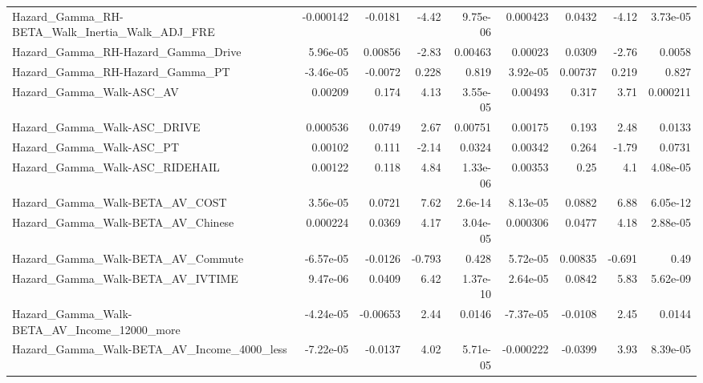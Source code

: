 \begin{tabular}{lrrrrrrrr}
Hazard\_Gamma\_RH-BETA\_Walk\_Inertia\_Walk\_ADJ\_FRE     &   -0.000142 &      -0.0181 &    -4.42 & 9.75e-06 &   0.000423 &      0.0432 &        -4.12 &      3.73e-05 \\
Hazard\_Gamma\_RH-Hazard\_Gamma\_Drive                 &    5.96e-05 &      0.00856 &    -2.83 &  0.00463 &    0.00023 &      0.0309 &        -2.76 &        0.0058 \\
Hazard\_Gamma\_RH-Hazard\_Gamma\_PT                    &   -3.46e-05 &      -0.0072 &    0.228 &    0.819 &   3.92e-05 &     0.00737 &        0.219 &         0.827 \\
Hazard\_Gamma\_Walk-ASC\_AV                           &     0.00209 &        0.174 &     4.13 & 3.55e-05 &    0.00493 &       0.317 &         3.71 &      0.000211 \\
Hazard\_Gamma\_Walk-ASC\_DRIVE                        &    0.000536 &       0.0749 &     2.67 &  0.00751 &    0.00175 &       0.193 &         2.48 &        0.0133 \\
Hazard\_Gamma\_Walk-ASC\_PT                           &     0.00102 &        0.111 &    -2.14 &   0.0324 &    0.00342 &       0.264 &        -1.79 &        0.0731 \\
Hazard\_Gamma\_Walk-ASC\_RIDEHAIL                     &     0.00122 &        0.118 &     4.84 & 1.33e-06 &    0.00353 &        0.25 &          4.1 &      4.08e-05 \\
Hazard\_Gamma\_Walk-BETA\_AV\_COST                     &    3.56e-05 &       0.0721 &     7.62 &  2.6e-14 &   8.13e-05 &      0.0882 &         6.88 &      6.05e-12 \\
Hazard\_Gamma\_Walk-BETA\_AV\_Chinese                  &    0.000224 &       0.0369 &     4.17 & 3.04e-05 &   0.000306 &      0.0477 &         4.18 &      2.88e-05 \\
Hazard\_Gamma\_Walk-BETA\_AV\_Commute                  &   -6.57e-05 &      -0.0126 &   -0.793 &    0.428 &   5.72e-05 &     0.00835 &       -0.691 &          0.49 \\
Hazard\_Gamma\_Walk-BETA\_AV\_IVTIME                   &    9.47e-06 &       0.0409 &     6.42 & 1.37e-10 &   2.64e-05 &      0.0842 &         5.83 &      5.62e-09 \\
Hazard\_Gamma\_Walk-BETA\_AV\_Income\_12000\_more        &   -4.24e-05 &     -0.00653 &     2.44 &   0.0146 &  -7.37e-05 &     -0.0108 &         2.45 &        0.0144 \\
Hazard\_Gamma\_Walk-BETA\_AV\_Income\_4000\_less         &   -7.22e-05 &      -0.0137 &     4.02 & 5.71e-05 &  -0.000222 &     -0.0399 &         3.93 &      8.39e-05 \\

\end{tabular}
